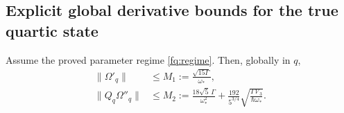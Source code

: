\subsection{Explicit global derivative bounds for the true quartic state}

\begin{lemma}
\label{fq:derivative-bounds}
Assume the proved parameter regime \eqref{fq:regime}. Then, globally
in $q$,
\begin{align}
 \|\Omega'_q\|&\leq M_1:=\frac{\sqrt{15\Gamma}}{\omega_*},
       \label{fq:M1}\\
 \|Q_q\Omega''_q\|&\leq M_2:=
 \frac{18\sqrt5\,\Gamma}{\omega_*^2}
 +\frac{192}{5^{3/4}}
        \sqrt{\frac{\Gamma\mathcal V_3}{\hbar\omega_*}}.
       \label{fq:M2}
\end{align}
\end{lemma}
